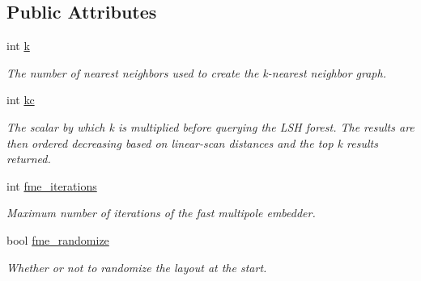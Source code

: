 \subsection*{Public Attributes}
\begin{DoxyCompactItemize}
\item 
\mbox{\label{structLayoutConfiguration_aeaf7404656862b423dfc63035f5e8bee}} 
int \hyperlink{structLayoutConfiguration_aeaf7404656862b423dfc63035f5e8bee}{k}
\begin{DoxyCompactList}\small\item\em The number of nearest neighbors used to create the k-\/nearest neighbor graph. \end{DoxyCompactList}\item 
\mbox{\label{structLayoutConfiguration_ac3e7def530d8c31537b8f9de6cd89fdc}} 
int \hyperlink{structLayoutConfiguration_ac3e7def530d8c31537b8f9de6cd89fdc}{kc}
\begin{DoxyCompactList}\small\item\em The scalar by which k is multiplied before querying the L\+SH forest. The results are then ordered decreasing based on linear-\/scan distances and the top k results returned. \end{DoxyCompactList}\item 
\mbox{\label{structLayoutConfiguration_afe033986b179ba0e419166b6fcb1dd35}} 
int \hyperlink{structLayoutConfiguration_afe033986b179ba0e419166b6fcb1dd35}{fme\+\_\+iterations}
\begin{DoxyCompactList}\small\item\em Maximum number of iterations of the fast multipole embedder. \end{DoxyCompactList}\item 
\mbox{\label{structLayoutConfiguration_a44383f49d302581f3e8300fb4677663e}} 
bool \hyperlink{structLayoutConfiguration_a44383f49d302581f3e8300fb4677663e}{fme\+\_\+randomize}
\begin{DoxyCompactList}\small\item\em Whether or not to randomize the layout at the start. \end{DoxyCompactList}\item 
\mbox{\label{structLayoutConfiguration_ab356194e6ee8b8ad276fd196b540ac02}} 

\end{DoxyCompactItemize}
